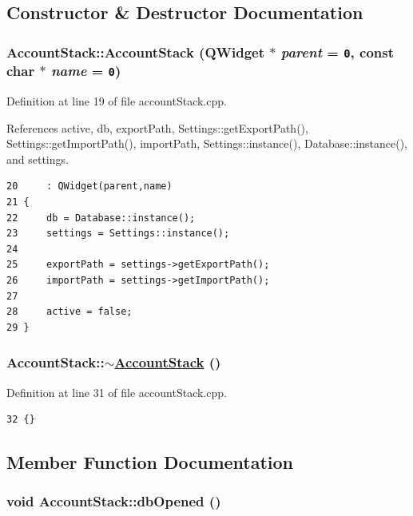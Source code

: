 \subsection{Constructor \& Destructor Documentation}
\hypertarget{classAccountStack_a0}{
\subsubsection[AccountStack]{\setlength{\rightskip}{0pt plus 5cm}Account\-Stack::Account\-Stack (QWidget $\ast$ {\em parent} = {\tt 0}, const char $\ast$ {\em name} = {\tt 0})}}
\label{classAccountStack_a0}


Definition at line 19 of file account\-Stack.cpp.

References active, db, export\-Path, Settings::get\-Export\-Path(), Settings::get\-Import\-Path(), import\-Path, Settings::instance(), Database::instance(), and settings.

\footnotesize\begin{verbatim}20     : QWidget(parent,name)
21 {
22     db = Database::instance();
23     settings = Settings::instance();
24 
25     exportPath = settings->getExportPath();
26     importPath = settings->getImportPath();
27 
28     active = false;
29 }
\end{verbatim}\normalsize 


\hypertarget{classAccountStack_a1}{
\subsubsection[$\sim$AccountStack]{\setlength{\rightskip}{0pt plus 5cm}Account\-Stack::$\sim$\hyperlink{classAccountStack}{Account\-Stack} ()}}
\label{classAccountStack_a1}


Definition at line 31 of file account\-Stack.cpp.

\footnotesize\begin{verbatim}32 {}
\end{verbatim}\normalsize 




\subsection{Member Function Documentation}
\hypertarget{classAccountStack_k0}{
\subsubsection[dbOpened]{\setlength{\rightskip}{0pt plus 5cm}void Account\-Stack::db\-Opened ()}}
\label{classAccountStack_k0}


